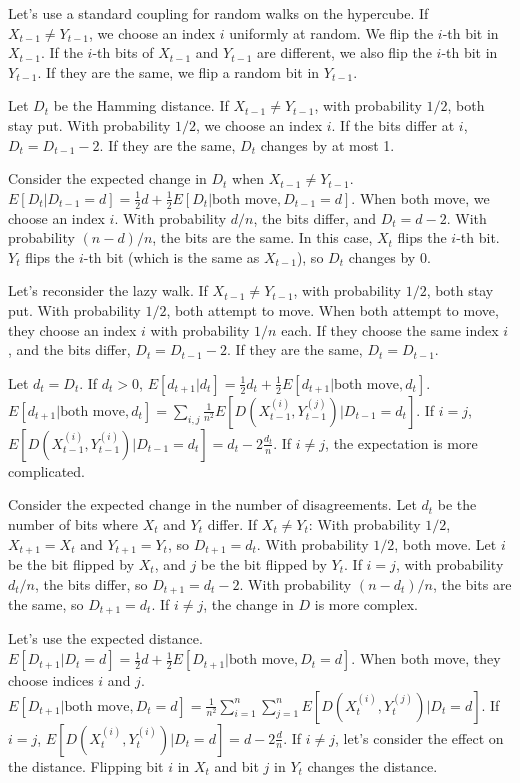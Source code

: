 \begin{enumerate}
\begin{shaded}
Let's use a standard coupling for random walks on the hypercube. If $X_{t-1} \neq Y_{t-1}$, we choose an index $i$ uniformly at random. We flip the $i$-th bit in $X_{t-1}$. If the $i$-th bits of $X_{t-1}$ and $Y_{t-1}$ are different, we also flip the $i$-th bit in $Y_{t-1}$. If they are the same, we flip a random bit in $Y_{t-1}$.

Let $D_t$ be the Hamming distance. If $X_{t-1} \neq Y_{t-1}$, with probability $1/2$, both stay put. With probability $1/2$, we choose an index $i$. If the bits differ at $i$, $D_t = D_{t-1} - 2$. If they are the same, $D_t$ changes by at most 1.

Consider the expected change in $D_t$ when $X_{t-1} \neq Y_{t-1}$.
$E[D_t | D_{t-1} = d] = \frac{1}{2} d + \frac{1}{2} E[D_t | \text{both move}, D_{t-1} = d]$.
When both move, we choose an index $i$. With probability $d/n$, the bits differ, and $D_t = d - 2$. With probability $(n-d)/n$, the bits are the same. In this case, $X_t$ flips the $i$-th bit. $Y_t$ flips the $i$-th bit (which is the same as $X_{t-1}$), so $D_t$ changes by 0.

Let's reconsider the lazy walk. If $X_{t-1} \neq Y_{t-1}$, with probability $1/2$, both stay put. With probability $1/2$, both attempt to move. When both attempt to move, they choose an index $i$ with probability $1/n$ each. If they choose the same index $i$, and the bits differ, $D_t = D_{t-1} - 2$. If they are the same, $D_t = D_{t-1}$.

Let $d_t = D_t$. If $d_t > 0$,
$E[d_{t+1} | d_t] = \frac{1}{2} d_t + \frac{1}{2} E[d_{t+1} | \text{both move}, d_t]$.
$E[d_{t+1} | \text{both move}, d_t] = \sum_{i,j} \frac{1}{n^2} E[D(X_{t-1}^{(i)}, Y_{t-1}^{(j)}) | D_{t-1} = d_t]$.
If $i = j$, $E[D(X_{t-1}^{(i)}, Y_{t-1}^{(i)}) | D_{t-1} = d_t] = d_t - 2 \frac{d_t}{n}$.
If $i \neq j$, the expectation is more complicated.

Consider the expected change in the number of disagreements. Let $d_t$ be the number of bits where $X_t$ and $Y_t$ differ.
If $X_t \neq Y_t$:
With probability $1/2$, $X_{t+1} = X_t$ and $Y_{t+1} = Y_t$, so $D_{t+1} = d_t$.
With probability $1/2$, both move. Let $i$ be the bit flipped by $X_t$, and $j$ be the bit flipped by $Y_t$.
If $i = j$, with probability $d_t / n$, the bits differ, so $D_{t+1} = d_t - 2$. With probability $(n - d_t) / n$, the bits are the same, so $D_{t+1} = d_t$.
If $i \neq j$, the change in $D$ is more complex.

Let's use the expected distance.
$E[D_{t+1} | D_t = d] = \frac{1}{2} d + \frac{1}{2} E[D_{t+1} | \text{both move}, D_t = d]$.
When both move, they choose indices $i$ and $j$.
$E[D_{t+1} | \text{both move}, D_t = d] = \frac{1}{n^2} \sum_{i=1}^n \sum_{j=1}^n E[D(X_t^{(i)}, Y_t^{(j)}) | D_t = d]$.
If $i = j$, $E[D(X_t^{(i)}, Y_t^{(i)}) | D_t = d] = d - 2 \frac{d}{n}$.
If $i \neq j$, let's consider the effect on the distance. Flipping bit $i$ in $X_t$ and bit $j$ in $Y_t$ changes the distance.


\end{shaded}
\end{enumerate}
